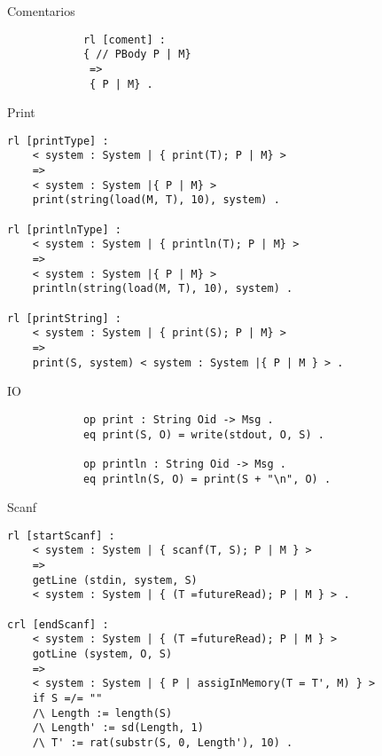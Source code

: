 \documentclass{beamer}
\begin{document}
    \begin{frame}[fragile]{Comentarios}
        \begin{verbatim}  
            rl [coment] :
            { // PBody P | M}
             =>
             { P | M} .
        \end{verbatim}
    \end{frame}

    \begin{frame}[fragile]{Print}
        \begin{verbatim}  
rl [printType] :
    < system : System | { print(T); P | M} >
    => 
    < system : System |{ P | M} > 
    print(string(load(M, T), 10), system) .

rl [printlnType] :
    < system : System | { println(T); P | M} >
    => 
    < system : System |{ P | M} > 
    println(string(load(M, T), 10), system) .

rl [printString] :
    < system : System | { print(S); P | M} >
    => 
    print(S, system) < system : System |{ P | M } > .
        \end{verbatim}
    \end{frame}

    \begin{frame}[fragile]{IO}
        \begin{verbatim}  
            op print : String Oid -> Msg .
            eq print(S, O) = write(stdout, O, S) .
        
            op println : String Oid -> Msg .
            eq println(S, O) = print(S + "\n", O) .
        \end{verbatim}
    \end{frame}

    \begin{frame}[fragile]{Scanf}
        \begin{verbatim}  
rl [startScanf] :
    < system : System | { scanf(T, S); P | M } >
    =>
    getLine (stdin, system, S) 
    < system : System | { (T =futureRead); P | M } > .
    
crl [endScanf] :
    < system : System | { (T =futureRead); P | M } > 
    gotLine (system, O, S)
    =>
    < system : System | { P | assigInMemory(T = T', M) } > 
    if S =/= "" 
    /\ Length := length(S)
    /\ Length' := sd(Length, 1)
    /\ T' := rat(substr(S, 0, Length'), 10) .
        \end{verbatim}
    \end{frame}
\end{document}
